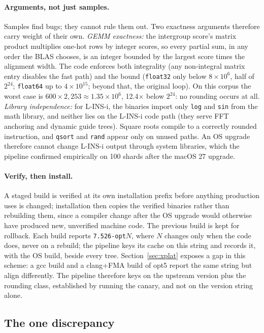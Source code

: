 \documentclass[11pt]{article}
\newcommand{\code}[1]{\texttt{#1}}
\begin{document}
\paragraph{Arguments, not just samples.} Samples find bugs; they cannot rule them out. Two
exactness arguments therefore carry weight of their own. \emph{GEMM exactness:} the
intergroup score's matrix product multiplies one-hot rows by integer scores, so every
partial sum, in any order the BLAS chooses, is an integer bounded by the largest score times
the alignment width. The code enforces both integrality (any non-integral matrix entry
disables the fast path) and the bound (\code{float32} only below $8\times10^6$, half of $2^{24}$;
\code{float64} up to $4\times10^{15}$; beyond that, the original loop). On this corpus the worst
case is $600 \times 2{,}253 \approx 1.35\times10^6$, 12.4$\times$ below $2^{24}$: no rounding
occurs at all. \emph{Library independence:} for L-INS-i, the binaries import only \code{log}
and \code{sin} from the math library, and neither lies on the L-INS-i code path (they serve
FFT anchoring and dynamic guide trees). Square roots compile to a correctly rounded
instruction, and \code{qsort} and \code{rand} appear only on unused paths. An OS upgrade
therefore cannot change L-INS-i output through system libraries, which the pipeline
confirmed empirically on 100 shards after the macOS 27 upgrade.

\paragraph{Verify, then install.} A staged build is verified at its own installation prefix
before anything production uses is changed; installation then copies the verified binaries
rather than rebuilding them, since a compiler change after the OS upgrade would otherwise
have produced new, unverified machine code. The previous build is kept for rollback.
\label{sec:provenance}
Each build reports \code{7.526-opt}$N$, where $N$ changes only when the code does, never on a
rebuild; the pipeline keys its cache on this string and records it, with the OS build, beside
every tree. Section~\ref{sec:xplat} exposes a gap in this scheme: a gcc build and a clang+FMA
build of opt5 report the same string but align differently. The pipeline therefore
keys on the upstream version plus the rounding class, established by running the canary, and
not on the version string alone.

\subsection{The one discrepancy}
\label{sec:bug}
\end{document}
